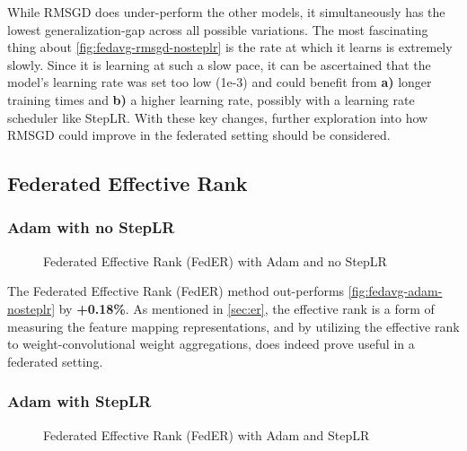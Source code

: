While RMSGD does under-perform the other models, it simultaneously has the lowest generalization-gap across all possible variations. The most fascinating thing about \autoref{fig:fedavg-rmsgd-nosteplr} is the rate at which it learns is extremely slowly. Since it is learning at such a slow pace, it can be ascertained that the model's learning rate was set too low (1e-3) and could benefit from \textbf{a)} longer training times and \textbf{b)} a higher learning rate, possibly with a learning rate scheduler like StepLR. With these key changes, further exploration into how RMSGD could improve in the federated setting should be considered.

\newpage
\subsection{Federated Effective Rank}%
\subsubsection{Adam with no StepLR}
\begin{figure}[H]
    \centering
    \hspace{-0.80cm}
    \caption{Federated Effective Rank (FedER) with Adam and no StepLR}
    \label{fig:feder-adam-nosteplr}
\end{figure}

The Federated Effective Rank (FedER) method out-performs \autoref{fig:fedavg-adam-nosteplr} by \textcolor{ao}{\textbf{+0.18\%}}. As mentioned in \autoref{sec:er}, the effective rank is a form of measuring the feature mapping representations, and by utilizing the effective rank to weight-convolutional weight aggregations, does indeed prove useful in a federated setting.


\newpage
\subsubsection{Adam with StepLR}

\begin{figure}[H]
    \centering
    \hspace{-0.80cm}
    \caption{Federated Effective Rank (FedER) with Adam and StepLR}
    \label{fig:feder-adam-steplr}
\end{figure}

